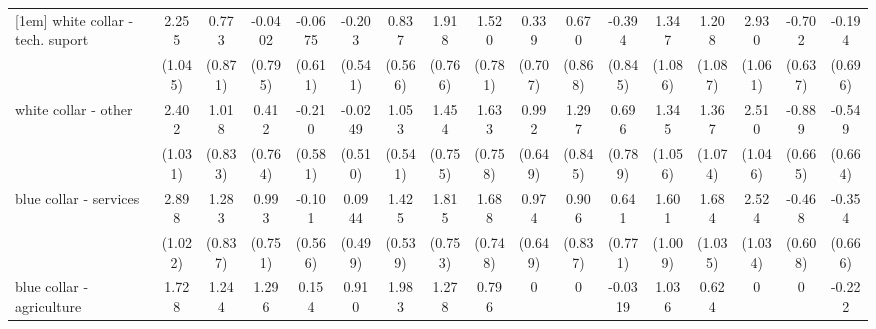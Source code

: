 {\begin{tabular}{l*{16}{c}}
[1em]
white collar - tech. suport&       2.255\sym{*}  &       0.773         &     -0.0402         &     -0.0675         &      -0.203         &       0.837         &       1.918\sym{*}  &       1.520         &       0.339         &       0.670         &      -0.394         &       1.347         &       1.208         &       2.930\sym{**} &      -0.702         &      -0.194         \\
                    &     (1.045)         &     (0.871)         &     (0.795)         &     (0.611)         &     (0.541)         &     (0.566)         &     (0.766)         &     (0.781)         &     (0.707)         &     (0.868)         &     (0.845)         &     (1.086)         &     (1.087)         &     (1.061)         &     (0.637)         &     (0.696)         \\
[1em]
white collar - other&       2.402\sym{*}  &       1.018         &       0.412         &      -0.210         &     -0.0249         &       1.053         &       1.454         &       1.633\sym{*}  &       0.992         &       1.297         &       0.696         &       1.345         &       1.367         &       2.510\sym{*}  &      -0.889         &      -0.549         \\
                    &     (1.031)         &     (0.833)         &     (0.764)         &     (0.581)         &     (0.510)         &     (0.541)         &     (0.755)         &     (0.758)         &     (0.649)         &     (0.845)         &     (0.789)         &     (1.056)         &     (1.074)         &     (1.046)         &     (0.665)         &     (0.664)         \\
[1em]
blue collar - services&       2.898\sym{**} &       1.283         &       0.993         &      -0.101         &      0.0944         &       1.425\sym{**} &       1.815\sym{*}  &       1.688\sym{*}  &       0.974         &       0.906         &       0.641         &       1.601         &       1.684         &       2.524\sym{*}  &      -0.468         &      -0.354         \\
                    &     (1.022)         &     (0.837)         &     (0.751)         &     (0.566)         &     (0.499)         &     (0.539)         &     (0.753)         &     (0.748)         &     (0.649)         &     (0.837)         &     (0.771)         &     (1.009)         &     (1.035)         &     (1.034)         &     (0.608)         &     (0.666)         \\
[1em]
blue collar - agriculture&       1.728         &       1.244         &       1.296         &       0.154         &       0.910         &       1.983\sym{*}  &       1.278         &       0.796         &           0         &           0         &     -0.0319         &       1.036         &       0.624         &           0         &           0         &      -0.222         \\

\end{tabular}}
